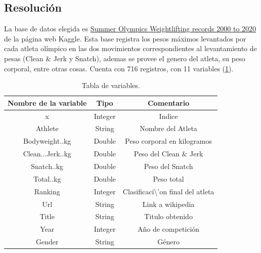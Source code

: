 \subsection{Resoluci\'on}
La base de datos elegida es \href{https://www.kaggle.com/datasets/yuxinc/summer-olympics-weightlifting-records-2000-to-2020}{Summer Olympics Weightlifting records 2000 to 2020} de la página web Kaggle.
Esta base registra los pesos máximos levantados por cada atleta olímpico en las dos movimientos correspondientes al levantamiento de pesas (Clean $\&$ Jerk y Snatch), ademas se provee el genero del atleta, su peso corporal, entre otras cosas. Cuenta con 716 registros, con 11 variables (\ref{tab:columnas}).\\
\begin{table}[H]
\centering
\begin{tabular}{|c|c|c|}
\hline
\textbf{Nombre de la variable} & \textbf{Tipo} & \textbf{Comentario}                             \\ \hline
x                              & Integer       & Indice                                          \\ \hline
Athlete                        & String        & Nombre del Atleta                               \\ \hline
Bodyweight..kg                 & Double        & Peso corporal en kilogramos                     \\ \hline
Clean...Jerk..kg               & Double        & Peso del Clean $\&$ Jerk                        \\ \hline
Snatch..kg                     & Double        & Peso del Snatch                                 \\ \hline
Total..kg                      & Double        & Peso total                                      \\ \hline
Ranking                        & Integer       & Clasificaci\textbackslash{}'on final del atleta \\ \hline
Url                            & String        & Link a wikipedia                                \\ \hline
Title                          & String        & Titulo obtenido                                 \\ \hline
Year                           & Integer       & Año de competición                              \\ \hline
Gender                         & String        & Género                                          \\ \hline
\end{tabular}
\caption{Tabla de variables.}
\label{tab:columnas}
\end{table}
